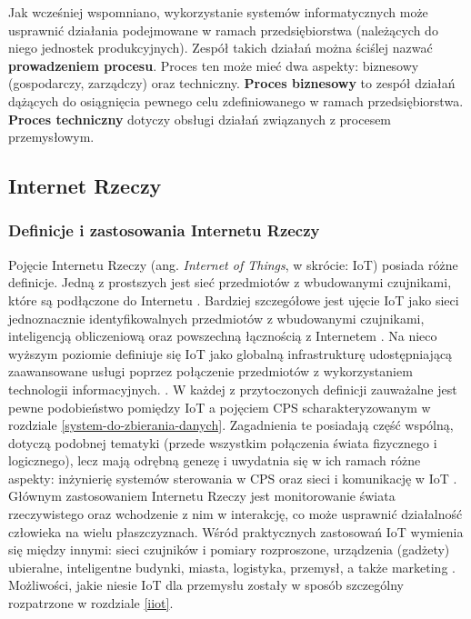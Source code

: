 \documentclass[a4paper, 12pt, twoside]{article}
\begin{document}
Jak wcześniej wspomniano, wykorzystanie systemów informatycznych może usprawnić
działania podejmowane w ramach przedsiębiorstwa (należących do niego jednostek produkcyjnych). 
Zespół takich działań można ściślej nazwać \textbf{prowadzeniem procesu}.
Proces ten może mieć dwa aspekty: biznesowy (gospodarczy, zarządczy) oraz techniczny. 
\textbf{Proces biznesowy} to zespół działań dążących do osiągnięcia pewnego celu
zdefiniowanego w ramach przedsiębiorstwa. \textbf{Proces techniczny} dotyczy
obsługi działań związanych z procesem przemysłowym. 


\subsection{Internet Rzeczy}

\subsubsection{Definicje i zastosowania Internetu Rzeczy}

Pojęcie Internetu Rzeczy (ang. \emph{Internet of Things}, w skrócie: IoT) posiada różne definicje. 
Jedną z prostszych jest sieć przedmiotów z wbudowanymi czujnikami, które są podłączone
do Internetu \cite{intro-to-iot}. Bardziej szczegółowe jest ujęcie IoT jako sieci jednoznacznie
identyfikowalnych przedmiotów z wbudowanymi czujnikami, inteligencją obliczeniową
oraz powszechną łącznością z Internetem \cite{iot-hype-to-reality}.
Na nieco wyższym poziomie definiuje się IoT jako globalną infrastrukturę udostępniającą
zaawansowane usługi poprzez połączenie przedmiotów z wykorzystaniem technologii informacyjnych.
\cite{intro-to-iot}. W każdej z przytoczonych
definicji zauważalne jest pewne podobieństwo pomiędzy IoT a pojęciem CPS 
scharakteryzowanym w rozdziale \ref{system-do-zbierania-danych}. Zagadnienia te
posiadają część wspólną, dotyczą podobnej tematyki (przede wszystkim połączenia świata fizycznego i logicznego), 
lecz mają odrębną genezę i uwydatnia się w ich ramach różne aspekty: 
inżynierię systemów sterowania w CPS oraz sieci i komunikację w IoT \cite{cps-vs-iot}.
Głównym zastosowaniem Internetu Rzeczy jest monitorowanie świata rzeczywistego 
oraz wchodzenie z nim w interakcję, co może usprawnić działalność człowieka na wielu płaszczyznach.
Wśród praktycznych zastosowań IoT wymienia się między innymi:
sieci czujników i pomiary rozproszone, urządzenia (gadżety) ubieralne, 
inteligentne budynki, miasta, logistyka, przemysł, a także marketing \cite{internet-reczy}. 
Możliwości, jakie niesie IoT dla przemysłu zostały w sposób szczególny rozpatrzone 
w rozdziale \ref{iiot}.
\end{document}
